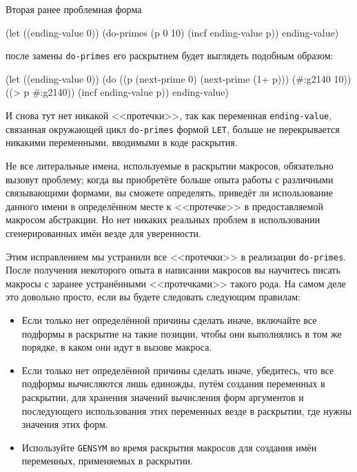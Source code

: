 Вторая ранее проблемная форма

\begin{myverb}
(let ((ending-value 0))
  (do-primes (p 0 10)
    (incf ending-value p))
  ending-value)
\end{myverb}

после замены \lstinline{do-primes} его раскрытием будет выглядеть подобным образом:

\begin{myverb}
(let ((ending-value 0))
  (do ((p (next-prime 0) (next-prime (1+ p)))
       (#:g2140 10))
      ((> p #:g2140))
    (incf ending-value p))
  ending-value)
\end{myverb}

И снова тут нет никакой <<протечки>>, так как переменная \lstinline{ending-value}, связанная
окружающей цикл \lstinline{do-primes} формой \lstinline{LET}, больше не перекрывается никакими
переменными, вводимыми в коде раскрытия.

Не все литеральные имена, используемые в раскрытии макросов, обязательно вызовут проблему;
когда вы приобретёте больше опыта работы с различными связывающими формами, вы сможете
определять, приведёт ли использование данного имени в определённом месте к <<протечке>> в
предоставляемой макросом абстракции. Но нет никаких реальных проблем в использовании
сгенерированных имён везде для уверенности.

Этим исправлением мы устранили все <<протечки>> в реализации \lstinline{do-primes}. После
получения некоторого опыта в написании макросов вы научитесь писать макросы с заранее
устранёнными <<протечками>> такого рода. На самом деле это довольно просто, если вы будете
следовать следующим правилам:
\begin{itemize}
\item Если только нет определённой причины сделать иначе, включайте все подформы в
  раскрытие на такие позиции, чтобы они выполнялись в том же порядке, в каком они идут в
  вызове макроса.
\item Если только нет определённой причины сделать иначе, убедитесь, что все подформы
  вычисляются лишь единожды, путём создания переменных в раскрытии, для хранения значений
  вычисления форм аргументов и последующего использования этих переменных везде в
  раскрытии, где нужны значения этих форм.
\item Используйте \lstinline{GENSYM} во время раскрытия макросов для создания имён
  переменных, применяемых в раскрытии.
\end{itemize}

